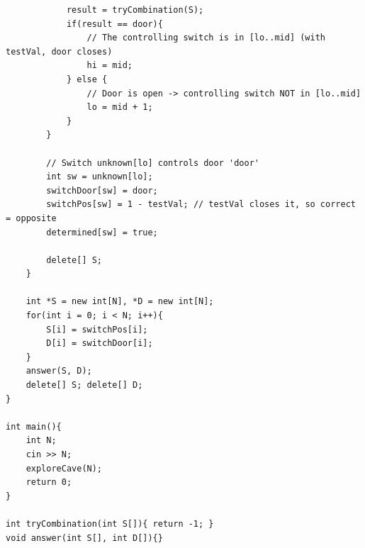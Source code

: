 \documentclass[11pt,a4paper]{article}
\begin{document}
\begin{lstlisting}
            result = tryCombination(S);
            if(result == door){
                // The controlling switch is in [lo..mid] (with testVal, door closes)
                hi = mid;
            } else {
                // Door is open -> controlling switch NOT in [lo..mid]
                lo = mid + 1;
            }
        }

        // Switch unknown[lo] controls door 'door'
        int sw = unknown[lo];
        switchDoor[sw] = door;
        switchPos[sw] = 1 - testVal; // testVal closes it, so correct = opposite
        determined[sw] = true;

        delete[] S;
    }

    int *S = new int[N], *D = new int[N];
    for(int i = 0; i < N; i++){
        S[i] = switchPos[i];
        D[i] = switchDoor[i];
    }
    answer(S, D);
    delete[] S; delete[] D;
}

int main(){
    int N;
    cin >> N;
    exploreCave(N);
    return 0;
}

int tryCombination(int S[]){ return -1; }
void answer(int S[], int D[]){}
\end{lstlisting}
\end{document}

